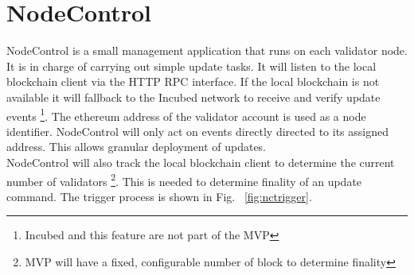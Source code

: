 \section{NodeControl}
\label{nodecontrol}

NodeControl is a small management application that runs on each validator node. It is in charge of carrying out simple update tasks.
It will listen to the local blockchain client via the HTTP RPC interface. If the local blockchain is not available it will fallback to the Incubed network to receive and verify update events \footnote{Incubed and this feature are not part of the MVP}.
The ethereum address of the validator account is used as a node identifier. NodeControl will only act on events directly directed to its assigned address.
This allows granular deployment of updates. \\

NodeControl will also track the local blockchain client to determine the current number of validators \footnote{MVP will have a fixed, configurable number of block to determine finality}. This is needed to determine finality of an update command.
The trigger process is shown in Fig. ~\ref{fig:nctrigger}.


